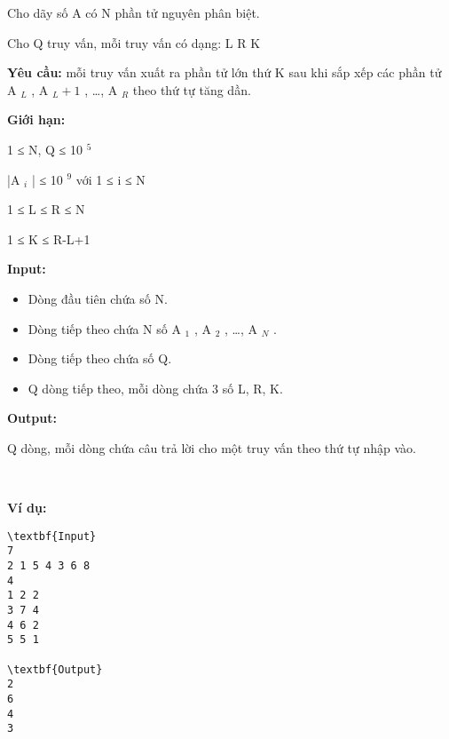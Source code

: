 

Cho dãy số A có N phần tử nguyên phân biệt.

Cho Q truy vấn, mỗi truy vấn có dạng: L R K

\textbf{Yêu cầu: } mỗi truy vấn xuất ra phần tử lớn thứ K sau khi sắp xếp các phần tử A $_ L $ , A $_ L+1 $ , …, A $_ R $ theo thứ tự tăng dần.

\textbf{Giới hạn: }

1 ≤ N, Q ≤ 10 $^ 5 $

|A $_ i $ | ≤ 10 $^ 9 $ với 1 ≤ i ≤ N

1 ≤ L ≤ R ≤ N

1 ≤ K ≤ R-L+1

\textbf{Input: }
\begin{itemize}
	\item Dòng đầu tiên chứa số N.
	\item Dòng tiếp theo chứa N số A $_ 1 $ , A $_ 2 $ , …, A $_ N $ .
	\item Dòng tiếp theo chứa số Q.
	\item Q dòng tiếp theo, mỗi dòng chứa 3 số L, R, K.
\end{itemize}

\textbf{Output: }

Q dòng, mỗi dòng chứa câu trả lời cho một truy vấn theo thứ tự nhập vào.

 

\textbf{Ví dụ: }
\begin{verbatim}
\textbf{Input}
7
2 1 5 4 3 6 8
4
1 2 2
3 7 4
4 6 2
5 5 1

\textbf{Output}
2
6
4
3\end{verbatim}